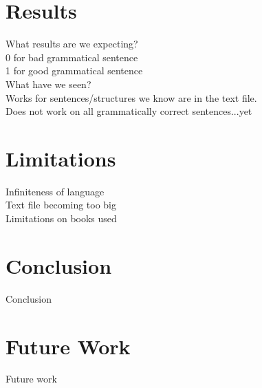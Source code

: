 \documentclass[12pt,a4paper]{article}
\begin{document}
\section{Results}
What results are we expecting?\\
0 for bad grammatical sentence\\
1 for good grammatical sentence\\

What have we seen?\\
Works for sentences/structures we know are in the text file.\\
Does not work on all grammatically correct sentences...yet\\



\section{Limitations}
Infiniteness of language\\
Text file becoming too big\\
Limitations on books used\\

\section{Conclusion}
Conclusion

\section{Future Work}
Future work

\newpage



\end{document}
